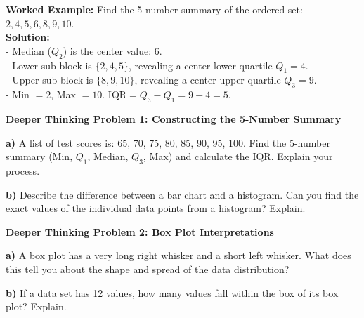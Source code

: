 \documentclass[12pt, letterpaper, fleqn]{article}
\begin{document}
\vspace{1mm}

\begin{tcolorbox}[colback=white, colframe=black!25, boxrule=0.6pt, arc=4mm, left=6mm, right=6mm, top=4mm, bottom=4mm]
\textbf{Worked Example:}
Find the 5-number summary of the ordered set: $2, 4, 5, 6, 8, 9, 10$.\\
\textbf{Solution:}\\
- Median ($Q_2$) is the center value: $6$.\\
- Lower sub-block is $\{2, 4, 5\}$, revealing a center lower quartile $Q_1 = 4$.\\
- Upper sub-block is $\{8, 9, 10\}$, revealing a center upper quartile $Q_3 = 9$.\\
- Min $= 2$, Max $= 10$. $\text{IQR} = Q_3 - Q_1 = 9 - 4 = 5$.
\end{tcolorbox}

\newpage

\begin{tcolorbox}[colback=white, colframe=black, boxrule=1pt, arc=4mm, left=6mm, right=6mm, top=5mm, bottom=5mm]
\textbf{Deeper Thinking Problem 1: Constructing the 5-Number Summary}

\medskip

\noindent
\textbf{a)} A list of test scores is: 65, 70, 75, 80, 85, 90, 95, 100. Find the 5-number summary (Min, $Q_1$, Median, $Q_3$, Max) and calculate the IQR. Explain your process.

\vspace{3.5cm}

\noindent
\textbf{b)} Describe the difference between a bar chart and a histogram. Can you find the exact values of the individual data points from a histogram? Explain.

\vspace{3cm}
\end{tcolorbox}

\vspace{0.2cm}

\begin{tcolorbox}[colback=white, colframe=black, boxrule=1pt, arc=4mm, left=6mm, right=6mm, top=5mm, bottom=5mm]
\textbf{Deeper Thinking Problem 2: Box Plot Interpretations}

\medskip

\noindent
\textbf{a)} A box plot has a very long right whisker and a short left whisker. What does this tell you about the shape and spread of the data distribution?

\vspace{3.5cm}

\noindent
\textbf{b)} If a data set has 12 values, how many values fall within the box of its box plot? Explain.

\vspace{3cm}
\end{tcolorbox}
\end{document}
